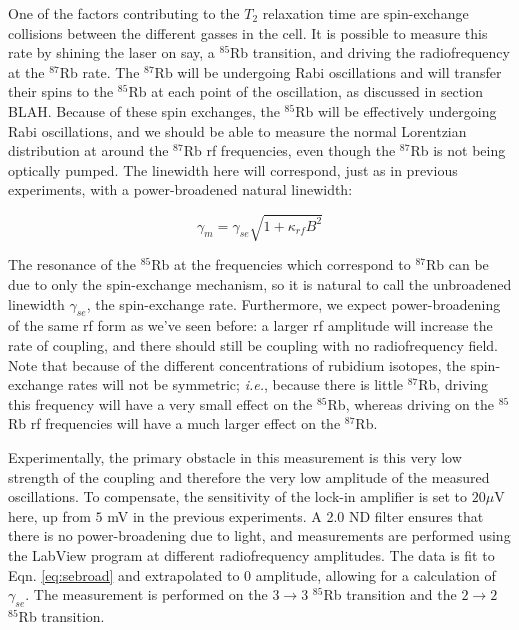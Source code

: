 One of the factors contributing to the $T_{2}$ relaxation time are spin-exchange collisions between the different gasses in the cell. It is possible to measure this rate by shining the laser on say, a $^{85}$Rb transition, and driving the radiofrequency at the $^{87}$Rb rate. The $^{87}$Rb will be undergoing Rabi oscillations and will transfer their spins to the $^{85}$Rb at each point of the oscillation, as discussed in section BLAH. Because of these spin exchanges, the $^{85}$Rb will be effectively undergoing Rabi oscillations, and we should be able to measure the normal Lorentzian distribution at around the $^{87}$Rb rf frequencies, even though the $^{87}$Rb is not being optically pumped. The linewidth here will correspond, just as in previous experiments, with a power-broadened natural linewidth:

\begin{equation}
\gamma_{m} = \gamma_{se} \sqrt{1+\kappa_{rf} B^{2}} \label{eq:sebroad}
\end{equation}

The resonance of the $^{85}$Rb at the frequencies which correspond to $^{87}$Rb can be due to only the spin-exchange mechanism, so it is natural to call the unbroadened linewidth $\gamma_{se}$, the spin-exchange rate. Furthermore, we expect power-broadening of the same rf form as we've seen before: a larger rf amplitude will increase the rate of coupling, and there should still be coupling with no radiofrequency field. Note that because of the different concentrations of rubidium isotopes, the spin-exchange rates will not be symmetric; \emph{i.e.}, because there is little  $^{87}$Rb, driving this frequency will have a very small effect on the $^{85}$Rb, whereas driving on the  $^{85}$Rb rf frequencies will have a much larger effect on the  $^{87}$Rb.

Experimentally, the primary obstacle in this measurement is this very low strength of the coupling and therefore the very low amplitude of the measured oscillations. To compensate, the sensitivity of the lock-in amplifier is set to $20 \mu$V here, up from $5$ mV in the previous experiments. A 2.0 ND filter ensures that there is no power-broadening due to light, and measurements are performed using the LabView program at different radiofrequency amplitudes. The data is fit to Eqn. \ref{eq:sebroad} and extrapolated to 0 amplitude, allowing for a calculation of $\gamma_{se}$. The measurement is performed on the $3\rightarrow3$  $^{85}$Rb transition and the $2\rightarrow2$ $^{85}$Rb transition. 

